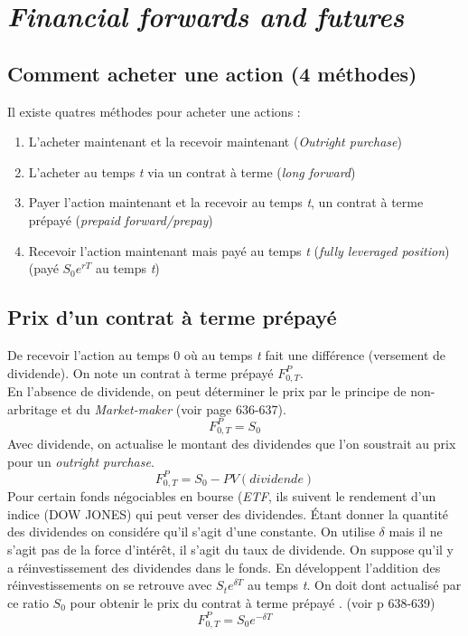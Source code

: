 \documentclass[11pt,french]{report}
\begin{document}

\chapter{\emph{Financial forwards and futures}}
\label{chap:forwards and futures}

\section{Comment acheter une action (4 méthodes)}

Il existe quatres méthodes pour acheter une actions :
\begin{enumerate}
\item L'acheter maintenant et la recevoir maintenant (\emph{Outright purchase})
\item L'acheter au temps \textit{t} via un contrat à terme (\emph{long forward})
\item Payer l'action maintenant et la recevoir au temps \textit{t}, un contrat à terme prépayé (\emph{prepaid forward/prepay})
\item Recevoir l'action maintenant mais payé au temps \textit{t} (\emph{fully leveraged position}) (payé $  S_0e^{rT}$ au temps \textit{t})
\end{enumerate}

\section{Prix d'un contrat à terme prépayé}
\label{sec:prepay price}

De recevoir l'action au temps 0 où au temps \emph{t} fait une différence (versement de dividende). On note un contrat à terme prépayé $ F_{0,T}^{P}$. 
\\En l'absence de dividende, on peut déterminer le prix par le principe de non-arbritage et du \emph{Market-maker} (voir page 636-637). 
\begin{equation}
F_{0,T}^{P} = S_0
\end{equation}
Avec dividende, on actualise le montant des dividendes que l'on soustrait au prix pour un \emph{outright purchase}.
\begin{equation}
F_{0,T}^{P} = S_0 - PV(dividende)
\end{equation}
Pour certain fonds négociables en bourse (\emph{ETF}, ils suivent le rendement d'un indice (DOW JONES) qui peut verser des dividendes. Étant donner la quantité des dividendes on considére qu'il s'agit d'une constante. On utilise $\delta$ mais il ne s'agit pas de la force d'intérêt, il s'agit du taux de dividende. On suppose qu'il y a réinvestissement des dividendes dans le fonds. En développent l'addition des réinvestissements on se retrouve avec $ S_t e^{\delta T}$ au temps \textit{t}. On doit dont actualisé par ce ratio $S_0$ pour obtenir le prix du contrat à terme prépayé . (voir p 638-639)
\begin{equation}
F_{0,T}^{P} = S_0e^{-\delta T}
\end{equation}
\end{document}
